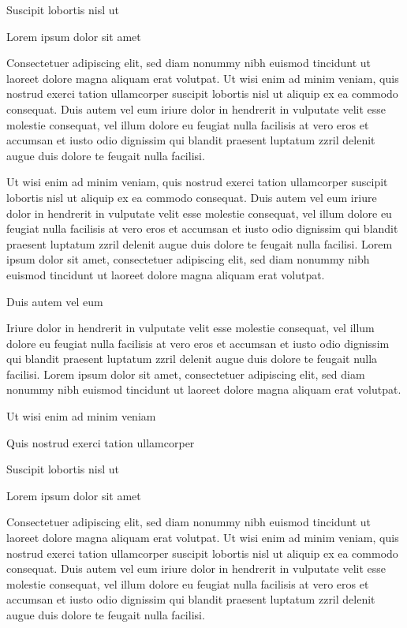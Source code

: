 \documentclass[11pt,twoside]{article}\makeatletter
\begin{document}
Suscipit lobortis nisl ut \par
Lorem ipsum dolor sit amet\par
Consectetuer adipiscing elit, sed diam nonummy nibh euismod tincidunt ut laoreet dolore magna aliquam erat volutpat. Ut wisi enim ad minim veniam, quis nostrud exerci tation ullamcorper suscipit lobortis nisl ut aliquip ex ea commodo consequat. Duis autem vel eum iriure dolor in hendrerit in vulputate velit esse molestie consequat, vel illum dolore eu feugiat nulla facilisis at vero eros et accumsan et iusto odio dignissim qui blandit praesent luptatum zzril delenit augue duis dolore te feugait nulla facilisi.\par
Ut wisi enim ad minim veniam, quis nostrud exerci tation ullamcorper suscipit lobortis nisl ut aliquip ex ea commodo consequat. Duis autem vel eum iriure dolor in hendrerit in vulputate velit esse molestie consequat, vel illum dolore eu feugiat nulla facilisis at vero eros et accumsan et iusto odio dignissim qui blandit praesent luptatum zzril delenit augue duis dolore te feugait nulla facilisi. Lorem ipsum dolor sit amet, consectetuer adipiscing elit, sed diam nonummy nibh euismod tincidunt ut laoreet dolore magna aliquam erat volutpat. \par
Duis autem vel eum \par
Iriure dolor in hendrerit in vulputate velit esse molestie consequat, vel illum dolore eu feugiat nulla facilisis at vero eros et accumsan et iusto odio dignissim qui blandit praesent luptatum zzril delenit augue duis dolore te feugait nulla facilisi. Lorem ipsum dolor sit amet, consectetuer adipiscing elit, sed diam nonummy nibh euismod tincidunt ut laoreet dolore magna aliquam erat volutpat. \par
Ut wisi enim ad minim veniam\par
Quis nostrud exerci tation ullamcorper \par
Suscipit lobortis nisl ut \par
Lorem ipsum dolor sit amet\par
Consectetuer adipiscing elit, sed diam nonummy nibh euismod tincidunt ut laoreet dolore magna aliquam erat volutpat. Ut wisi enim ad minim veniam, quis nostrud exerci tation ullamcorper suscipit lobortis nisl ut aliquip ex ea commodo consequat. Duis autem vel eum iriure dolor in hendrerit in vulputate velit esse molestie consequat, vel illum dolore eu feugiat nulla facilisis at vero eros et accumsan et iusto odio dignissim qui blandit praesent luptatum zzril delenit augue duis dolore te feugait nulla facilisi.\par
\end{document}
